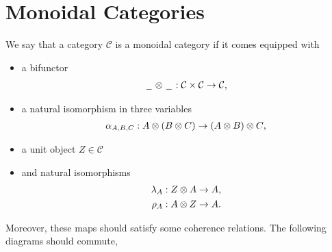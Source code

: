 \documentclass[../thesis.tex]{subfiles}
\begin{document}
    \section{Monoidal Categories}

        \begin{definition}
            
            We say that a category $\mathcal{C}$ is a monoidal category if it comes equipped with 
            \begin{itemize}
                \item a bifunctor
                \begin{align*}
                    \argument \otimes \argument : \mathcal{C} \times \mathcal{C} \rightarrow \mathcal{C}\tt{,}
                \end{align*}
                \item a natural isomorphism in three variables
                \begin{align*}
                    \alpha_{A,B,C} : A \otimes (B \otimes C) \rightarrow (A \otimes B) \otimes C\tt{,}
                \end{align*}
                \item a unit object $Z \in \mathcal{C}$
                \item and natural isomorphisms
                \begin{align*}
                    \lambda_A & : Z \otimes A \rightarrow A\tt{,} \\
                    \rho_A & : A \otimes Z \rightarrow A\tt{.}
                \end{align*}
            \end{itemize}
            Moreover, these maps should satisfy some coherence relations. The following diagrams should commute,
            \begin{center}
\end{center}
\end{definition}
\end{document}
